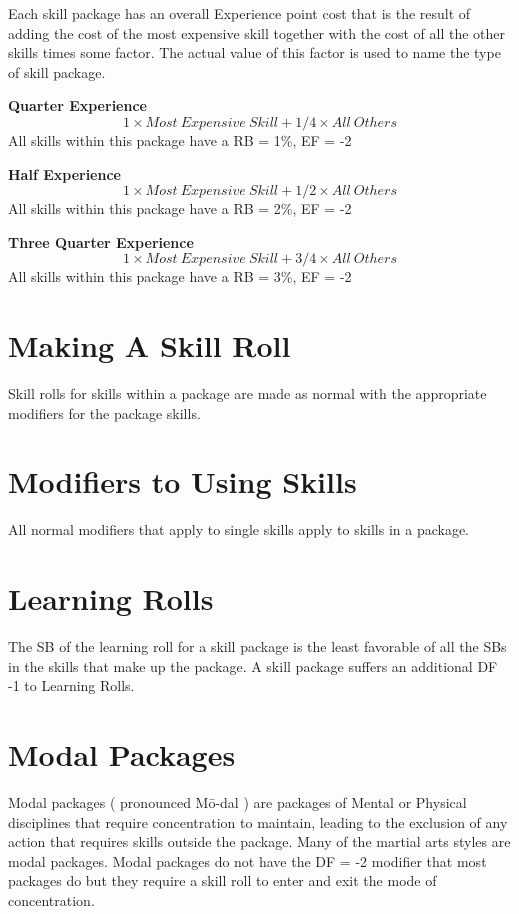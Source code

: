 Each skill package has an overall Experience point cost that is
the result of adding the cost of the most expensive skill together
with the cost of all the other skills times some factor. The actual value
of this factor is used to name the type of skill package.

{\bf Quarter Experience}
\[ 1 \times Most\ Expensive\ Skill + 1/4 \times All\ Others \]
All skills within this package have a RB = 1\%, EF = -2 

{\bf Half Experience }
\[ 1 \times Most\ Expensive\ Skill + 1/2 \times All\ Others \]
All skills within this package have a RB = 2\%, EF = -2

{\bf Three Quarter Experience}
\[ 1 \times Most\ Expensive\ Skill + 3/4 \times All\ Others \] 
All skills within this package have a RB = 3\%, EF = -2

\section{Making A Skill Roll} 

Skill rolls for skills within a package are made as normal with the
appropriate modifiers for the package skills.

\section{Modifiers to Using Skills}
All normal modifiers that apply to single skills apply to skills in a package.

\section{Learning Rolls}
The SB of the learning roll for a skill package is the least favorable 
of all the SBs in the skills that make up the package. A skill package 
suffers an additional DF -1 to Learning Rolls.

\section{Modal Packages}

Modal packages ( pronounced M\=o-dal ) are packages of Mental or Physical disciplines 
that require concentration to maintain, leading to the exclusion of any action that
requires skills outside the package. Many of the martial arts styles are modal
packages.  Modal packages do not have the DF = -2 modifier that most packages do
but they require a skill roll to enter and exit the mode of concentration.

